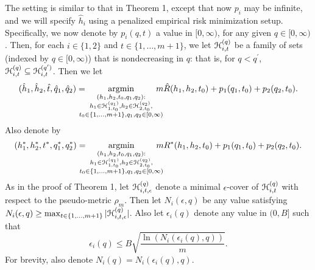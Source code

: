 \documentclass{article}
\newcommand{\pen}[0]{p}
\begin{document}
The setting is similar to that in Theorem 1, except that now $p_{i}$ may be infinite, and we will specify $\hat{h}_{i}$
using a penalized empirical risk minimization setup.
Specifically, we now denote by $\pen_{i}(q,t)$ a value in $[0,\infty)$, for any given $q \in [0,\infty)$.
Then, for each $i \in \{1,2\}$ and $t \in \{1,\ldots,m+1\}$, we let $\mathcal H_{i,t}^{(q)}$ be a family of sets (indexed by $q \in [0,\infty)$)
that is nondecreasing in $q$: that is, for $q < q^{\prime}$, $\mathcal H_{i,t}^{(q)} \subseteq \mathcal H_{i,t}^{(q^{\prime})}$.
Then we let 
\begin{equation*}
(\hat{h}_{1},\hat{h}_{2},\hat{t},\hat{q}_{1},\hat{q}_{2}) =\!\!\!\!\!\! \argmin_{\substack{(h_{1},h_{2},t_{0},q_{1},q_{2}) : \\ h_{1} \in \H_{1,t_{0}}^{(q_{1})}, h_{2} \in \H_{2,t_{0}}^{(q_{2})}, \\ t_{0} \in \{1,\ldots,m+1\}, q_{1},q_{2} \in [0,\infty)}} \!\!\!\!\!\! m \hat{R}(h_{1},h_{2},t_{0}) + \pen_{1}(q_{1},t_{0}) + \pen_{2}(q_{2},t_{0}).
\end{equation*}
Also denote by
\begin{equation*}
(h_{1}^{*},h_{2}^{*},t^{*},q_{1}^{*},q_{2}^{*}) =\!\!\!\!\!\! \argmin_{\substack{(h_{1},h_{2},t_{0},q_{1},q_{2}) : \\ h_{1} \in \H_{1,t_{0}}^{(q_{1})}, h_{2} \in \H_{2,t_{0}}^{(q_{2})}, \\ t_{0} \in \{1,\ldots,m+1\}, q_{1},q_{2} \in [0,\infty)}} \!\!\!\!\!\! m R^{*}(h_{1},h_{2},t_{0}) + \pen_{1}(q_{1},t_{0}) + \pen_{2}(q_{2},t_{0}).
\end{equation*}
As in the proof of Theorem 1, let $\mathcal H_{i,t,\epsilon}^{(q)}$ denote a minimal $\epsilon$-cover of $\mathcal H_{i,t}^{(q)}$ with respect to the pseudo-metric $\rho_{m}$.
Then let $N_{i}(\epsilon,q)$ be any value satisfying $N_{i}(\epsilon,q) \geq \max_{t \in \{1,\ldots,m+1\}} |\mathcal H_{i,t,\epsilon}^{(q)}|$.
Also let $\epsilon_{i}(q)$ denote any value in $(0,B]$ such that
\begin{equation*}
\epsilon_{i}(q) \leq B\sqrt{\frac{\ln(N_{i}(\epsilon_{i}(q),q))}{m}}.
\end{equation*}
For brevity, also denote $N_{i}(q) = N_{i}(\epsilon_{i}(q),q)$.
\end{document}
